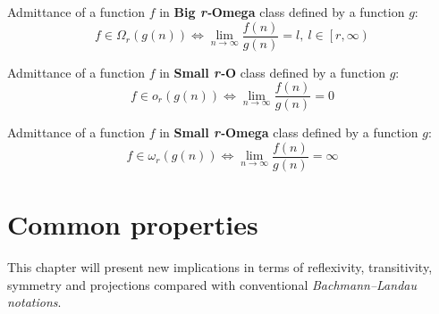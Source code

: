 \begin{theorem} Admittance of a function $f$ in \textbf{Big \textit{r-}Omega} class defined by a function $g$: 
      \[ f \in \Omega_{r}(g(n)) \Leftrightarrow \lim_{n\to\infty} \dfrac{f(n)}{g(n)} = l,\ l \in \left[ r, \infty \right) \]
\end{theorem}   

\begin{theorem} Admittance of a function $f$ in \textbf{Small \textit{r-}O} class defined by a function $g$:
    \[ f \in o_{r}(g(n)) \Leftrightarrow \lim_{n\to\infty} \dfrac{f(n)}{g(n)} = 0 \]
\end{theorem}   

\begin{theorem} Admittance of a function $f$ in \textbf{Small \textit{r-}Omega} class defined by a function $g$:
    \[ f \in \omega_{r}(g(n)) \Leftrightarrow \lim_{n\to\infty} \dfrac{f(n)}{g(n)} = \infty \]
\end{theorem}   




\section{Common properties}
This chapter will present new implications in terms of reflexivity, transitivity, symmetry and projections compared with conventional \textit{Bachmann–Landau notations}.

